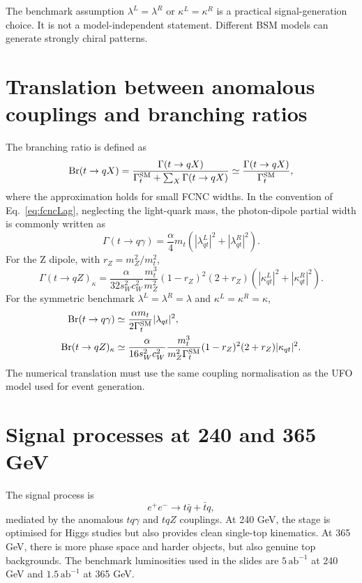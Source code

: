 \documentclass[11pt,a4paper]{report}
\newcommand{\ee}{e^+e^-}
\newcommand{\br}{\mathrm{Br}}
\newcommand{\abinv}{\,\mathrm{ab}^{-1}}
\begin{document}
\begin{warningbox}
The benchmark assumption $\lambda^L=\lambda^R$ or $\kappa^L=\kappa^R$ is a practical signal-generation choice.  It is not a model-independent statement.  Different BSM models can generate strongly chiral patterns.
\end{warningbox}

\section{Translation between anomalous couplings and branching ratios}
The branching ratio is defined as
\begin{equation}
  \br(t\to qX)=\frac{\Gamma(t\to qX)}{\Gamma_t^{\rm SM}+\sum_X\Gamma(t\to qX)}
  \simeq\frac{\Gamma(t\to qX)}{\Gamma_t^{\rm SM}},
\end{equation}
where the approximation holds for small FCNC widths.  In the convention of Eq.~\eqref{eq:fcncLag}, neglecting the light-quark mass, the photon-dipole partial width is commonly written as
\begin{equation}
  \Gamma(t\to q\gamma)=\frac{\alpha}{4}m_t\left(|\lambda^L_{qt}|^2+|\lambda^R_{qt}|^2\right).
\end{equation}
For the Z dipole, with $r_Z=m_Z^2/m_t^2$,
\begin{equation}
  \Gamma(t\to qZ)_\kappa=\frac{\alpha}{32s_W^2c_W^2}\frac{m_t^3}{m_Z^2}(1-r_Z)^2(2+r_Z)
  \left(|\kappa^L_{qt}|^2+|\kappa^R_{qt}|^2\right).
\end{equation}
For the symmetric benchmark $\lambda^L=\lambda^R=\lambda$ and $\kappa^L=\kappa^R=\kappa$,
\begin{align}
  \br(t\to q\gamma)&\simeq\frac{\alpha m_t}{2\Gamma_t^{\rm SM}}|\lambda_{qt}|^2,\\
  \br(t\to qZ)_\kappa&\simeq\frac{\alpha}{16s_W^2c_W^2}\frac{m_t^3}{m_Z^2\Gamma_t^{\rm SM}}(1-r_Z)^2(2+r_Z)|\kappa_{qt}|^2.
\end{align}
The numerical translation must use the same coupling normalisation as the UFO model used for event generation.

\section{Signal processes at 240 and 365 GeV}
The signal process is
\begin{equation}
  \ee\to t\bar q+\bar t q,
\end{equation}
mediated by the anomalous $tq\gamma$ and $tqZ$ couplings.  At 240 GeV, the stage is optimised for Higgs studies but also provides clean single-top kinematics.  At 365 GeV, there is more phase space and harder objects, but also genuine top backgrounds.  The benchmark luminosities used in the slides are $5\abinv$ at 240 GeV and $1.5\abinv$ at 365 GeV.
\end{document}
